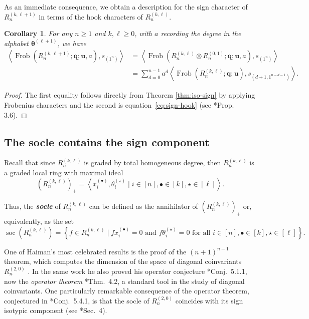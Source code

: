 \documentclass[11pt, reqno]{amsart}
\newtheorem{corollary}[theorem]{Corollary}
\theoremstyle{definition}
\theoremstyle{remark}
\numberwithin{equation}{section}
\newcommand{\0}{\emptyset}
\DeclareMathOperator{\Frob}{Frob}
\DeclareMathOperator{\soc}{soc}
\newcommand{\newword}[1]{\emph{\textbf{#1}}}
\begin{document}
As an immediate consequence, we obtain a description for the sign character of 
$R_n^{(k,\ell+1)}$ in terms of the hook characters of $R_n^{(k,\ell)}$.

\begin{corollary}\label{cor:hook-to-sign-sf}
    For any $n\geq 1$ and $k,\ell \geq 0$, with $a$ recording the degree in the alphabet $\bm{\theta}^{(\ell+1)}$, we have
    \begin{align*}
        \left\langle \Frob(R_n^{(k,\ell+1)}; \mathbf{q};\mathbf{u}, a), s_{(1^n)} \right\rangle
   &= \left\langle \Frob(R_n^{(k,\ell)} \otimes R_n^{(0,1)}; \mathbf{q};\mathbf{u}, a), s_{(1^n)} \right\rangle\\
   &= \sum_{d=0}^{n-1} a^d \left\langle \Frob(R_n^{(k,\ell)}; \mathbf{q};\mathbf{u}), s_{(d+1,1^{n-d-1})}\right\rangle.
    \end{align*}
\end{corollary}

\begin{proof}
    The first equality follows directly from Theorem \ref{thm:iso-sign} by applying Frobenius characters and the second is equation~\eqref{eq:sign-hook} (see \cite{GLM}*{Prop. 3.6}).
\end{proof}

\subsection{The socle contains the sign component}
Recall that since $R_n^{(k,\ell)}$ is graded by total homogeneous degree, 
then $R_n^{(k,\ell)}$ is a graded local ring with maximal ideal 
\[
    (R_n^{(k,\ell)})_+= 
    \left\langle  x_i^{(\bullet)}, \theta_i^{(\star)} \mid  
    i \in [n], \bullet \in [k], \star \in [\ell] \right\rangle.
\]

Thus, the \newword{socle} of $R_n^{(k,\ell)}$ can be defined as 
the annihilator of $(R_n^{(k,\ell)})_+$ or, equivalently, as the set 
\[
    \soc(R_n^{(k,\ell)}) = \left\{ f \in R_n^{(k,\ell)} \mid f x_i^{(\bullet)} =0 
    \text{ and } 
    f \theta_i^{(\star)} =0 \text{ for all } i \in [n], \bullet \in [k], \star \in [\ell] \right\}.
\]

One of Haiman's most celebrated results is the proof of the $(n+1)^{n-1}$ theorem, which computes the dimension of the space of diagonal coinvariants $R_n^{(2,0)}$ \cite{Haiman2002}. In the same work he also proved his operator conjecture \cite{Haiman1994}*{Conj.~5.1.1}, now the \emph{operator theorem} \cite{Haiman2002}*{Thm.~4.2}, a standard tool in the study of diagonal coinvariants. One particularly remarkable consequence of the operator theorem, conjectured in \cite{Haiman1994}*{Conj.~5.4.1}, is that the socle of $R_n^{(2,0)}$ coincides with its sign isotypic component (see \cite{Haiman2002}*{Sec.~4}). 
\end{document}
